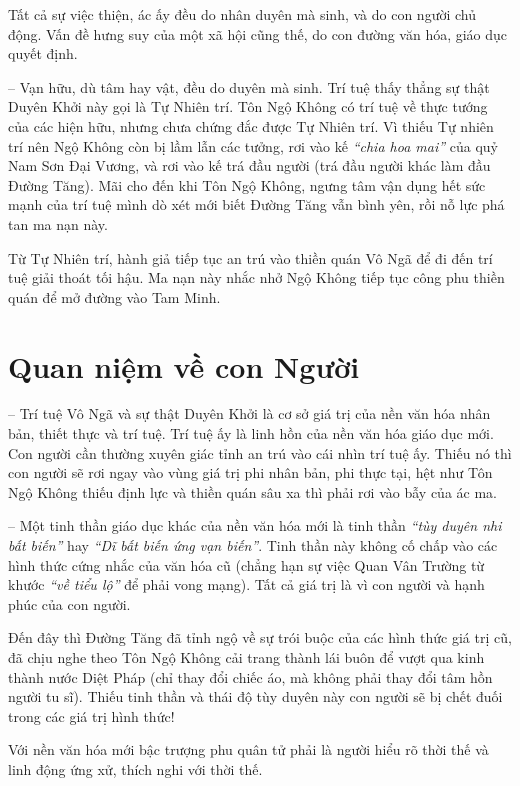 Tất cả sự việc thiện, ác ấy đều do nhân duyên mà sinh, và do con người chủ động. Vấn đề hưng suy của một xã hội cũng thế, do con đường văn hóa, giáo dục quyết định.

-- Vạn hữu, dù tâm hay vật, đều do duyên mà sinh. Trí tuệ thấy thẳng sự thật Duyên Khởi này gọi là Tự Nhiên trí. Tôn Ngộ Không có trí tuệ về thực tướng của các hiện hữu, nhưng chưa chứng đắc được Tự Nhiên trí. Vì thiếu Tự nhiên trí nên Ngộ Không còn bị lầm lẫn các tưởng, rơi vào kế \emph{``chia hoa mai''} của quỷ Nam Sơn Đại Vương, và rơi vào kế trá đầu người (trá đầu người khác làm đầu Đường Tăng). Mãi cho đến khi Tôn Ngộ Không, ngưng tâm vận dụng hết sức mạnh của trí tuệ mình dò xét mới biết Đường Tăng vẫn bình yên, rồi nỗ lực phá tan ma nạn này.

Từ Tự Nhiên trí, hành giả tiếp tục an trú vào thiền quán Vô Ngã để đi đến trí tuệ giải thoát tối hậu. Ma nạn này nhắc nhở Ngộ Không tiếp tục công phu thiền quán để mở đường vào Tam Minh.

\section{Quan niệm về con Người} %
\label{sec:84_85_con_nguoi}

-- Trí tuệ Vô Ngã và sự thật Duyên Khởi là cơ sở giá trị của nền văn hóa nhân bản, thiết thực và trí tuệ. Trí tuệ ấy là linh hồn của nền văn hóa giáo dục mới. Con người cần thường xuyên giác tỉnh an trú vào cái nhìn trí tuệ ấy. Thiếu nó thì con người sẽ rơi ngay vào vùng giá trị phi nhân bản, phi thực tại, hệt như Tôn Ngộ Không thiếu định lực và thiền quán sâu xa thì phải rơi vào bẫy của ác ma.

-- Một tinh thần giáo dục khác của nền văn hóa mới là tinh thần \emph{``tùy duyên nhi bất biến''} hay \emph{``Dĩ bất biến ứng vạn biến''}. Tinh thần này không cố chấp vào các hình thức cứng nhắc của văn hóa cũ (chẳng hạn sự việc Quan Vân Trường từ khước \emph{``về tiểu lộ''} để phải vong mạng). Tất cả giá trị là vì con người và hạnh phúc của con người.

Đến đây thì Đường Tăng đã tỉnh ngộ về sự trói buộc của các hình thức giá trị cũ, đã chịu nghe theo Tôn Ngộ Không cải trang thành lái buôn để vượt qua kinh thành nước Diệt Pháp (chỉ thay đổi chiếc áo, mà không phải thay đổi tâm hồn người tu sĩ). Thiếu tinh thần và thái độ tùy duyên này con người sẽ bị chết đuối trong các giá trị hình thức!

Với nền văn hóa mới bậc trượng phu quân tử phải là người hiểu rõ thời thế và linh động ứng xử, thích nghi với thời thế.

